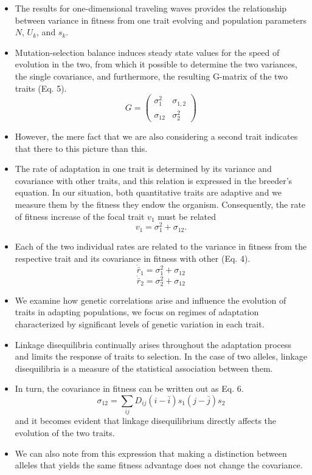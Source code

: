 \documentclass[11pt,one column]{article}
\begin{document}
\begin{itemize}
\begin{itemize}
\item The results for one-dimensional traveling waves provides the relationship between variance in fitness from one trait evolving and population parameters $N$, $U_k$, and $s_k$. 
\item Mutation-selection balance induces steady state values for the speed of evolution in the two, from which it possible to determine the two variances, the single covariance, and furthermore, the resulting G-matrix of the two traits (Eq. 5). \[ G= \left( \begin{array}{cc} \sigma_1^2& \sigma_{1,2}\\ \sigma_{12} & \sigma_2^2 \end{array} \right) \]
\item However, the mere fact that we are also considering a second trait indicates that there to this picture than this.
\item The rate of adaptation in one trait is determined by its variance and covariance with other traits, and this relation is expressed in the breeder’s equation. In our situation, both quantitative traits are adaptive and we measure them by the fitness they endow the organism. Consequently, the rate of fitness increase of the focal trait $v_1$ must be related \[v_1=\sigma_1^2+\sigma_{12}.\]
\item Each of the two individual rates are related to the variance in fitness from the respective trait and its covariance in fitness with other (Eq. 4). \[ \dot{\bar{r}}_1=\sigma_1^2+\sigma_{12}\] \[ \dot{\bar{r}}_2=\sigma_2^2+\sigma_{12} \]
\item We examine how genetic correlations arise and influence the evolution of traits in adapting populations, we focus on regimes of adaptation characterized by significant levels of genetic variation in each trait. 
\item Linkage disequilibria continually arises throughout the adaptation process and limits the response of traits to selection. In the case of two alleles, linkage disequilibria is a measure of the statistical association between them. 
\item In turn, the covariance in fitness can be written out as Eq. 6. \[ \sigma_{12}=\sum_{ij}D_{ij}(i-\bar{i})s_1 (j-\bar{j}) s_2 \] and it becomes evident that linkage disequilibrium directly affects the evolution of the two traits.
\item We can also note from this expression that making a distinction between alleles that yields the same fitness advantage does not change the covariance.
\end{itemize}


\end{itemize}
\end{document}
